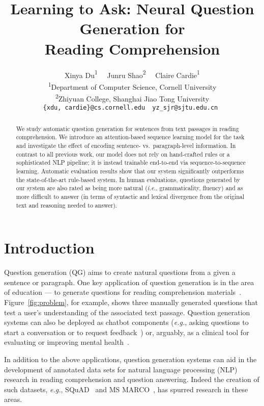 \documentclass[11pt,a4paper]{article}
\title{Learning to Ask: Neural Question Generation for \\
       Reading Comprehension}
\author{Xinya Du{\normalfont \textsuperscript{1}}  \quad \ \ Junru Shao{\normalfont \textsuperscript{2}} \quad \ \ Claire Cardie{\normalfont \textsuperscript{1}}\\
  \textsuperscript{1}Department of Computer Science, Cornell University\\
   \textsuperscript{2}Zhiyuan College, Shanghai Jiao Tong University\\
  {\tt \{xdu, cardie\}@cs.cornell.edu \  yz\_sjr@sjtu.edu.cn  } \\
  }
\date{}
\newcommand{\ie}{{\em i.e.}}
\newcommand{\eg}{{\em e.g.}}
\begin{document}
\maketitle
\begin{abstract}

We study automatic question generation for sentences from text passages in reading comprehension. We introduce an attention-based sequence learning model for the task and investigate the effect of encoding sentence- vs.\ paragraph-level information. In contrast to all previous work, our model does not rely on hand-crafted rules or a sophisticated NLP pipeline;  it is instead trainable end-to-end via sequence-to-sequence learning. Automatic evaluation results show that our system significantly outperforms the state-of-the-art rule-based system. In human evaluations, questions generated by our system are also rated as being more natural (\ie, grammaticality, fluency) and as more difficult to answer (in terms of syntactic and lexical divergence from the original text and reasoning needed to answer).
\end{abstract}

\section{Introduction}


Question generation (QG) aims to create natural questions from a given a sentence or paragraph.
%
One key application of question generation is in the area of education --- to generate questions for reading comprehension materials~\cite{heilman2010good}. Figure~\ref{fig:problem}, for example, shows three manually generated questions that test a user's understanding of the associated text passage.
Question generation systems can also be deployed
as chatbot components (\eg, asking questions to start a conversation or to request feedback~\cite{nasrin2016vqg}) or, arguably,
as a clinical tool for evaluating or improving mental health~\cite{Weizenbaum1966eliza, parry1971colby}.

In addition to the above applications, question generation systems can aid in the development of annotated data sets for natural language processing (NLP) research in reading comprehension and question answering. Indeed the creation of such datasets, \eg, SQuAD~\cite{rajpurkar2016squad} and MS MARCO~\cite{nguyen2016msmarco}, has spurred research in these areas.
\end{document}
